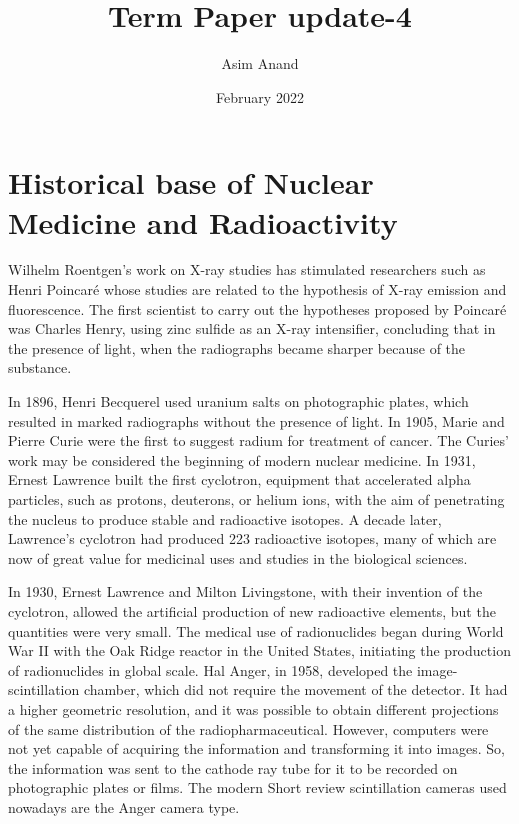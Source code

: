 \documentclass{article}
\title{Term Paper update-4}
\author{Asim Anand}
\date{February 2022}
\begin{document}
\maketitle

\section{Historical base of Nuclear Medicine and Radioactivity}
Wilhelm Roentgen’s work on X-ray studies has stimulated  researchers  such  as  Henri  Poincaré whose studies are related to the hypothesis of X-ray emission  and fluorescence.  The  first  scientist  to carry out the hypotheses proposed by Poincaré was Charles  Henry,  using  zinc  sulfide  as  an  X-ray intensifier, concluding that in the presence of light, when the radiographs became sharper because of the substance.

In 1896, Henri Becquerel used uranium salts on photographic  plates,  which  resulted  in  marked radiographs without the presence of light. In 1905, Marie and  Pierre Curie  were the  first to suggest radium for treatment of cancer. The Curies’ work may  be  considered  the  beginning  of  modern nuclear medicine. In 1931, Ernest Lawrence built the  first  cyclotron,  equipment  that  accelerated alpha  particles,  such  as  protons,  deuterons,  or helium  ions,  with  the  aim  of  penetrating  the nucleus to produce stable and radioactive isotopes. A decade later, Lawrence’s cyclotron had produced 223 radioactive isotopes, many of which are now of great value for medicinal uses and studies in the biological sciences.

In  1930,  Ernest  Lawrence  and  Milton Livingstone, with their invention of the cyclotron, allowed the artificial production of new radioactive elements, but the quantities were very small. The medical use of radionuclides began during World War II with the Oak Ridge reactor in the United States, initiating the production of radionuclides in global scale.  Hal Anger,  in 1958,  developed  the image-scintillation chamber, which did not require the  movement  of  the  detector.  It  had  a  higher geometric resolution, and it was possible to obtain different projections of the same distribution of the radiopharmaceutical.  However,  computers  were not yet capable of acquiring the information and transforming it  into  images. So,  the information was sent to the cathode ray tube for it to be recorded on  photographic  plates  or  films.  The  modern Short review scintillation cameras used nowadays are the Anger camera type.
\end{document}
